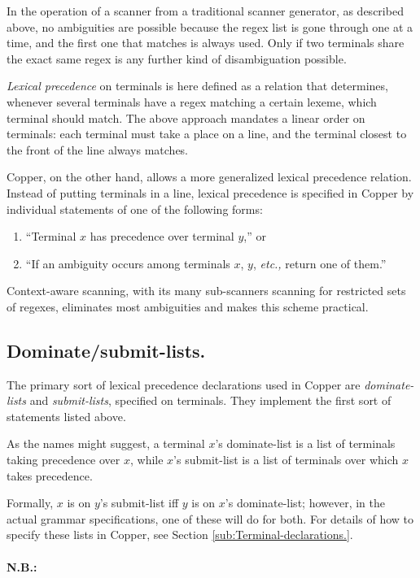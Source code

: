 \documentclass[12pt,english,twoside]{report}
\newcommand\sectionname{Section}
\begin{document}
In the operation of a scanner from a traditional scanner generator,
as described above, no ambiguities are possible because the regex
list is gone through one at a time, and the first one that matches
is always used. Only if two terminals share the exact same regex is
any further kind of disambiguation possible.

\emph{Lexical precedence} on terminals is here defined as a relation
that determines, whenever several terminals have a regex matching
a certain lexeme, which terminal should match. The above approach
mandates a linear order on terminals: each terminal must take a place
on a line, and the terminal closest to the front of the line always
matches.

Copper, on the other hand, allows a more generalized lexical precedence
relation. Instead of putting terminals in a line, lexical precedence
is specified in Copper by individual statements of one of the following
forms:

\begin{enumerate}
\item {}``Terminal $x$ has precedence over terminal $y$,'' or
\item {}``If an ambiguity occurs among terminals $x$, $y$, \emph{etc.,}
return one of them.''
\end{enumerate}
Context-aware scanning, with its many sub-scanners scanning for restricted
sets of regexes, eliminates most ambiguities and makes this scheme
practical.


\subsection{Dominate/submit-lists.}

The primary sort of lexical precedence declarations used in Copper
are \emph{dominate-lists} and \emph{submit-lists}, specified on terminals.
They implement the first sort of statements listed above.

As the names might suggest, a terminal $x$'s dominate-list is a list
of terminals taking precedence over $x$, while $x$'s submit-list
is a list of terminals over which $x$ takes precedence.

Formally, $x$ is on $y$'s submit-list iff $y$ is on $x$'s dominate-list;
however, in the actual grammar specifications, one of these will do
for both. For details of how to specify these lists in Copper, see
\sectionname{} \ref{sub:Terminal-declarations.}.


\paragraph{N.B.:}
\end{document}
